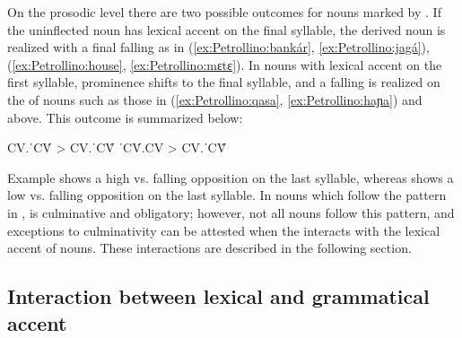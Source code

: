 \documentclass[output=paper]{LSP/langsci}
\begin{document}
On the prosodic level there are two possible outcomes for nouns marked by  . If the uninflected noun has lexical accent on the final syllable, the derived  noun is realized with a final falling  as in (\ref{ex:Petrollino:bankár}, \ref{ex:Petrollino:jagá}), (\ref{ex:Petrollino:house}, \ref{ex:Petrollino:mɛtɛ}). In nouns with lexical accent on the first syllable, prominence shifts to the final syllable, and a falling  is realized on the  of nouns such as those in (\ref{ex:Petrollino:qasa}, \ref{ex:Petrollino:haɲa}) and  above. This outcome is summarized below:

\begin{exe}
\ex \begin{xlist} \label{ex:Petrollino:35}
\ex \label{CV.CV̂} CV.ˈCV́ > CV.ˈCV̂ \label{ex:Petrollino:35a}
\ex ˈCV́.CV > CV.ˈCV̂ \label{ex:Petrollino:35b}
\end{xlist}
\end{exe}
Example  shows a high vs. falling opposition on the last syllable, whereas  shows a low vs. falling opposition on the last syllable. In  nouns which follow the pattern in ,  is culminative and obligatory; however, not all nouns follow this pattern, and exceptions to culminativity can be attested when the  interacts with the lexical accent of nouns. These interactions are described in the following section.

\subsection{Interaction between lexical and grammatical accent} \label{sec:Petrollino:interaction}
\end{document}
